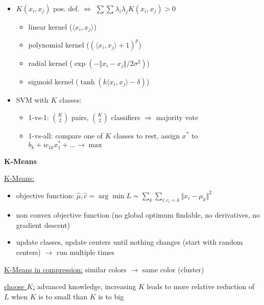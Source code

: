 \documentclass[10pt,landscape,a4paper]{article}
\begin{document}
\begin{multicols*}{4}
\begin{itemize}
	\item $K(x_i,x_j)$ pos. def. $\Leftrightarrow$ $\sum\sum \lambda_i\lambda_j K(x_i,x_j) > 0$
	\begin{itemize}
		\item linear kernel ($\langle x_i,x_j\rangle$)
		\item polynomial kernel ($(\langle x_i,x_j\rangle + 1)^p$)
		\item radial kernel ($\exp(-\Vert x_i-x_j\Vert/2\sigma^2)$)
		\item sigmoid kernel ($\tanh(k\langle x_i,x_j\rangle - \delta)$)
	\end{itemize}
	\item SVM with $K$ classes: 
	\begin{itemize}
		\item 1-vs-1: $\binom{K}{2}$ pairs, $\binom{K}{2}$ classifiers $\Rightarrow$ majority vote
		\item 1-vs-all: compare one of $K$ classes to rest, assign $x^\ast$ to $b_k + w_{1k}x_1^\ast + ...\to\max$
	\end{itemize}
\end{itemize}

\begin{center}
	\normalsize{\textbf{K-Means}} \\
\end{center}
\underline{K-Means:}
\begin{itemize}
	\item objective function: $\hat{\mu},\hat{c} = \arg\min L = \sum_k\sum_{i:c_i=k} \Vert x_i-\mu_k\Vert^2$
	\item non convex objective function (no global optimum findable, no derivatives, no gradient descent)
	\item update classes, update centers until nothing changes (start with random centers) $\to$ run multiple times
\end{itemize}
\underline{K-Means in compression:} similar colors $\to$ same color (cluster)

\underline{choose $K$:} advanced knowledge, increasing $K$ leads to more relative reduction of $L$ when $K$ is to small than $K$ is to big


\end{multicols*}
\end{document}
